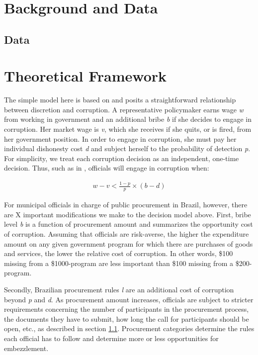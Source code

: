 \documentclass[11pt]{article}
\begin{document}
\section{Background and Data} \label{sec:background}

\subsection{Data} \label{subsec:data}

\section{Theoretical Framework} \label{sec:theory}
The simple model here is based on \citet{OlkenCorruptionDevelopingCountries2012b} and posits a straightforward relationship between discretion and corruption. A representative policymaker earns wage \emph{w} from working in government and an additional bribe \emph{b} if she decides to engage in corruption. Her market wage is \emph{v}, which she receives if she quits, or is fired, from her government position. In order to engage in corruption, she must pay her individual dishonesty cost \emph{d} and subject herself to the probability of detection \emph{p}. For simplicity, we treat each corruption decision as an independent, one-time decision. Thus, such as in \citet{OlkenCorruptionDevelopingCountries2012b}, officials will engage in corruption when:

\begin{equation}
  \begin{split}
    w - v < \frac{1-p}{p}\times(b-d)
  \end{split}
\end{equation}

For municipal officials in charge of public procurement in Brazil, however, there are X important modifications we make to the decision model above. First, bribe level \emph{b} is a function of procurement amount and summarizes the opportunity cost of corruption. Assuming that officials are risk-averse, the higher the expenditure amount on any given government program for which there are purchases of goods and services, the lower the relative cost of corruption. In other words, \$100 missing from a \$1000-program are less important than \$100 missing from a \$200-program.

Secondly, Brazilian procurement rules \emph{l} are an additional cost of corruption beyond \emph{p} and \emph{d}. As procurement amount increases, officials are subject to stricter requirements concerning the number of participants in the procurement process, the documents they have to submit, how long the call for participants should be open, etc., as described in section \ref{subsec:data}. Procurement categories determine the rules each official has to follow and determine more or less opportunities for embezzlement.
\end{document}
